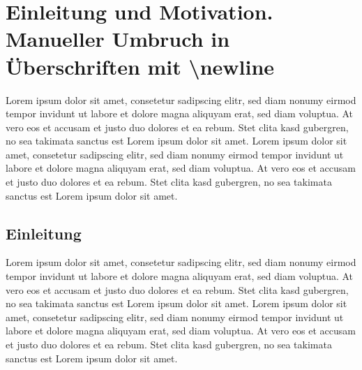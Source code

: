 
\chapter[Einleitung und Motivation]{Einleitung und Motivation. Manueller Umbruch in Überschriften \newline mit \glqq \textbackslash newline\grqq{}}
\label{cha:Einleitung und Motivation}
Lorem ipsum dolor sit amet, consetetur sadipscing elitr, sed diam nonumy eirmod tempor invidunt ut labore et dolore magna aliquyam erat, sed diam voluptua. At vero eos et accusam et justo duo dolores et ea rebum. Stet clita kasd gubergren, no sea takimata sanctus est Lorem ipsum dolor sit amet. Lorem ipsum dolor sit amet, consetetur sadipscing elitr, sed diam nonumy eirmod tempor invidunt ut labore et dolore magna aliquyam erat, sed diam voluptua. At vero eos et accusam et justo duo dolores et ea rebum. Stet clita kasd gubergren, no sea takimata sanctus est Lorem ipsum dolor sit amet.

\section{Einleitung}
\label{sec:Einleitung}
Lorem ipsum dolor sit amet, consetetur sadipscing elitr, sed diam nonumy eirmod tempor invidunt ut labore et dolore magna aliquyam erat, sed diam voluptua. At vero eos et accusam et justo duo dolores et ea rebum. Stet clita kasd gubergren, no sea takimata sanctus est Lorem ipsum dolor sit amet. Lorem ipsum dolor sit amet, consetetur sadipscing elitr, sed diam nonumy eirmod tempor invidunt ut labore et dolore magna aliquyam erat, sed diam voluptua. At vero eos et accusam et justo duo dolores et ea rebum. Stet clita kasd gubergren, no sea takimata sanctus est Lorem ipsum dolor sit amet.

